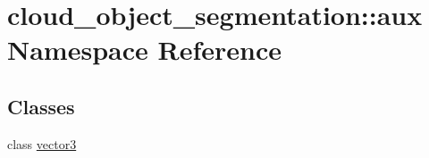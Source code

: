 \hypertarget{namespacecloud__object__segmentation_1_1aux}{}\section{cloud\+\_\+object\+\_\+segmentation\+:\+:aux Namespace Reference}
\label{namespacecloud__object__segmentation_1_1aux}
\subsection*{Classes}
\begin{DoxyCompactItemize}
\item 
class \hyperlink{classcloud__object__segmentation_1_1aux_1_1vector3}{vector3}
\end{DoxyCompactItemize}
